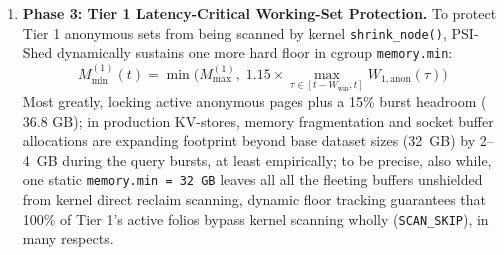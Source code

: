\documentclass[pdflatex,sn-mathphys,Numbered]{sn-jnl}
\begin{document}
\begin{enumerate}
\begin{itemize}
        \begin{equation}
        \texttt{process\_madvise}(pidfd_{\text{Tier2}}, \; iov_{\text{cold}}, \; \texttt{MADV\_PAGEOUT}, \; 0)
        \label{eq:madvise}
        \end{equation}
        evicting clean streaming file-cache pages into the page lists asynchronously in $< 5\ \mu\text{s}$ without blocking tenant worker threads, in actual application.
        \item \textit{Transparent Black-Box Fallback Mode (Unmodified Containers):} For unmodified, off-the-shelf container images (e.g., Kafka, RocksDB, Redis), PSI-Shed removes the need for shared-memory descriptors by tackling the standardized upstream Linux 6.8 cgroup v2 interface:
        \begin{equation}
        \texttt{echo } \Delta M_{\text{reclaim}} \texttt{ > /sys/fs/cgroup/tier2.slice/memory.reclaim}
        \label{eq:mem_reclaim}
        \end{equation}
        proactively instructing kernel background threads to reclaim cold file folios outside the container namespace without altering application code or incurring pagemap scanning overhead, to the significant degree, in the primary.
    \end{itemize}
    \item \textbf{Phase 3: Tier 1 Latency-Critical Working-Set Protection.} To protect Tier 1 anonymous sets from being scanned by kernel \texttt{shrink\_node()}, PSI-Shed dynamically sustains one more hard floor in cgroup \texttt{memory.min}:
    \begin{equation}
    M_{\text{min}}^{(1)}(t) = \min\Big(M_{\text{max}}^{(1)}, \; 1.15 \times \max_{\tau \in [t - W_{\text{win}}, t]} W_{1,\text{anon}}(\tau)\Big)
    \label{eq:mem_min}
    \end{equation}
    Most greatly, locking active anonymous pages plus a 15\% burst headroom ($36.8\text{ GB}$); in production KV-stores, memory fragmentation and socket buffer allocations are expanding footprint beyond base dataset sizes (32~GB) by 2--4~GB during the query bursts, at least empirically; to be precise, also while, one static \texttt{memory.min = 32 GB} leaves all all the fleeting buffers unshielded from kernel direct reclaim scanning, dynamic floor tracking guarantees that 100\% of Tier 1's active folios bypass kernel scanning wholly (\texttt{SCAN\_SKIP}), in many respects.
\end{enumerate}
\end{document}
